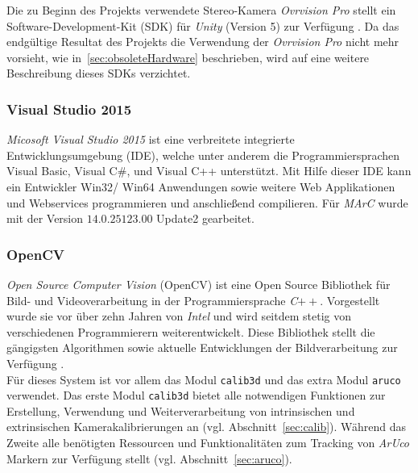 Die zu Beginn des Projekts verwendete Stereo-Kamera \emph{Ovrvision Pro} stellt ein Software-Development-Kit (SDK) für \textit{Unity} (Version 5) zur Verfügung \cite{website:ovrvisionSetup}. Da das endgültige Resultat des Projekts die Verwendung der \emph{Ovrvision Pro} nicht mehr vorsieht, wie in~\ref{sec:obsoleteHardware} beschrieben, wird auf eine weitere Beschreibung dieses SDKs verzichtet.

\subsubsection{Visual Studio 2015}\label{sec:VisualStudio} 
\textit{Micosoft Visual Studio 2015} ist eine verbreitete integrierte Entwicklungsumgebung (IDE), welche unter anderem die Programmiersprachen Visual Basic, Visual C$\#$, und Visual C++ unterstützt. Mit Hilfe dieser IDE kann ein Entwickler Win32/ Win64 Anwendungen sowie weitere Web Applikationen und Webservices \cite{website:VisuStud} programmieren und anschließend compilieren. Für \textit{MArC} wurde mit der Version $14.0.25123.00$ Update2 gearbeitet.

\subsubsection{OpenCV} \label{sec:OpenCV} 
\textit{Open Source Computer Vision} (OpenCV) ist eine Open Source Bibliothek für Bild- und Videoverarbeitung in der Programmiersprache \textit{C}$++$. Vorgestellt wurde sie vor über zehn Jahren von \textit{Intel} und wird seitdem stetig von verschiedenen Programmierern weiterentwickelt. Diese Bibliothek stellt die gängigsten Algorithmen sowie aktuelle Entwicklungen der Bildverarbeitung zur Verfügung
\cite{article:OpenCV}.\\
Für dieses System ist vor allem das Modul \texttt{calib3d} \cite{website:Calib3dDoc} und das extra Modul \texttt{aruco} \cite{website:ArucoDoc} verwendet. Das erste Modul \texttt{calib3d}  bietet alle notwendigen Funktionen zur Erstellung, Verwendung und Weiterverarbeitung von intrinsischen und extrinsischen Kamerakalibrierungen an (vgl. Abschnitt~\ref{sec:calib}). Während das Zweite alle benötigten Ressourcen und Funktionalitäten zum Tracking von \textit{ArUco} Markern zur Verfügung stellt (vgl. Abschnitt~\ref{sec:aruco}).


